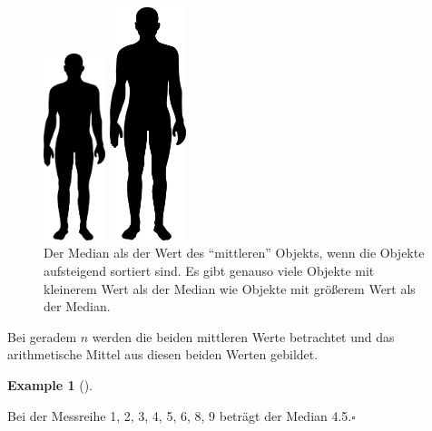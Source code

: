 \documentclass[
  letterpaper,
  DIV=11,
  numbers=noendperiod]{scrartcl}
\theoremstyle{definition}
\newtheorem{example}{Example}[section]
\theoremstyle{definition}
\theoremstyle{definition}
\theoremstyle{remark}
\begin{document}
\begin{figure}
\begin{minipage}{0.20\linewidth}
\includegraphics[width=0.16\textwidth,height=\textheight]{img/Human_Silhouette.svg.png}

\end{minipage}%
%
\begin{minipage}{0.20\linewidth}

\includegraphics[width=0.2\textwidth,height=\textheight]{img/Human_Silhouette.svg.png}

\end{minipage}%

\caption{\label{fig-median-human}Der Median als der Wert des
``mittleren'' Objekts, wenn die Objekte aufsteigend sortiert sind. Es
gibt genauso viele Objekte mit kleinerem Wert als der Median wie Objekte
mit größerem Wert als der Median.}

\end{figure}%

Bei geradem \(n\) werden die beiden mittleren Werte betrachtet und das
arithmetische Mittel aus diesen beiden Werten gebildet.

\begin{example}[]\protect\hypertarget{exm-med2}{}\label{exm-med2}

Bei der Messreihe 1, 2, 3, 4, 5, 6, 8, 9 beträgt der Median
4.5.\(\square\)

\end{example}
\end{document}
